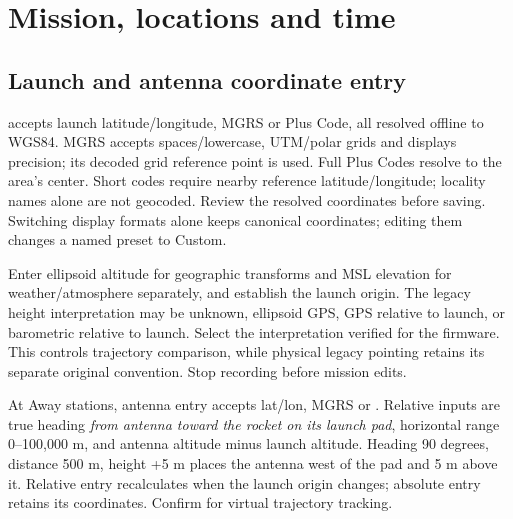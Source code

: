 \section{Mission, locations and time}\label{sec:mission}
\subsection{Launch and antenna coordinate entry}
 accepts launch latitude/longitude, MGRS or Plus
Code, all resolved offline to WGS84. MGRS accepts spaces/lowercase, UTM/polar
grids and displays precision; its decoded grid reference point is used.
Full Plus Codes resolve to the area's center. Short codes require nearby
reference latitude/longitude; locality names alone are not geocoded. Review
the resolved coordinates before saving. Switching display formats alone keeps
canonical coordinates; editing them changes a named preset to Custom.

Enter ellipsoid altitude for geographic transforms and MSL elevation for
weather/atmosphere separately, and establish the launch origin. The legacy
height interpretation may be unknown, ellipsoid GPS, GPS relative to launch,
or barometric relative to launch. Select the interpretation verified for the
firmware. This controls trajectory comparison, while physical legacy pointing
retains its separate original convention. Stop recording before mission edits.

At Away stations, antenna entry accepts lat/lon, MGRS or . Relative inputs are true heading \emph{from antenna toward the rocket
on its launch pad}, horizontal range 0--100,000 m, and antenna altitude minus
launch altitude. Heading 90 degrees, distance 500 m, height +5 m places the
antenna west of the pad and 5 m above it. Relative entry recalculates when the
launch origin changes; absolute entry retains its coordinates. Confirm
 for virtual trajectory tracking.


